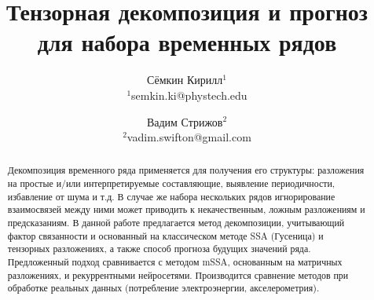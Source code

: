 
\usepackage[backend=biber, sorting=none]{biblatex}
\usepackage{subfigure}



\theoremstyle{definition}
\newtheorem*{Def}{Определение}
\theoremstyle{plain}
\newtheorem{Lem}{Лемма}
\newtheorem{Th}{Теорема}

\usepackage{listings}



\lstset{style=mystyle}

\newcommand{\delayV}[1]{\overset{\leftarrow}{\mathbf{x}}_{#1}}
\newcommand{\delayM}[1]{\overset{\leftarrow}{\mathbf{X}}_{#1}}

\title{Тензорная декомпозиция и прогноз для набора временных рядов}
\author{Сёмкин Кирилл$^{1}$ \\ {\footnotesize $^{1}$semkin.ki@phystech.edu} \and Вадим Стрижов$^{2}$ \\ {\footnotesize $^{2}$vadim.swifton@gmail.com}}
\date{}



	
	\maketitle
	
	\begin{abstract}
		
		Декомпозиция временного ряда применяется для получения его структуры: разложения на простые и/или интерпретируемые составляющие, выявление периодичности, избавление от шума и т.д. В случае же набора нескольких рядов игнорирование взаимосвязей между ними может приводить к некачественным, ложным разложениям и предсказаниям. В данной работе предлагается метод декомпозиции, учитывающий фактор связанности и основанный на классическом методе SSA (Гусеница) и тензорных разложениях, а также способ прогноза будущих значений ряда. Предложенный подход сравнивается с методом mSSA, основанным на матричных разложениях, и рекуррентными нейросетями. Производится сравнение методов при обработке реальных данных (потребление электроэнергии, акселерометрия).
		
	\end{abstract}
	
